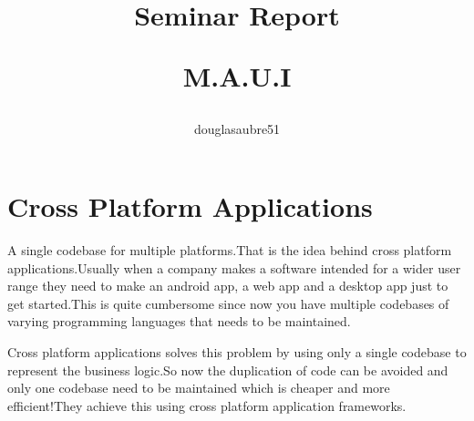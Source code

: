 \documentclass[14pt]{extarticle}
\title{
     \huge Seminar Report \par
     \Huge M.A.U.I
}
\author{
    douglasaubre51
}
\begin{document}
\maketitle
{}

\newpage
{}

\section{
  Cross Platform Applications
 }
A single codebase for multiple platforms.That is the idea behind cross platform applications.Usually when a company makes a software intended for a wider user range they need to make an android app, a web app and a desktop app just to get started.This is quite cumbersome since now you have multiple codebases of varying programming languages that needs to be maintained.

Cross platform applications solves this problem by using only a single codebase to represent the business logic.So now the duplication of code can be avoided and only one codebase need to be maintained which is cheaper and more efficient!They achieve this using cross platform application frameworks.

\end{document}
